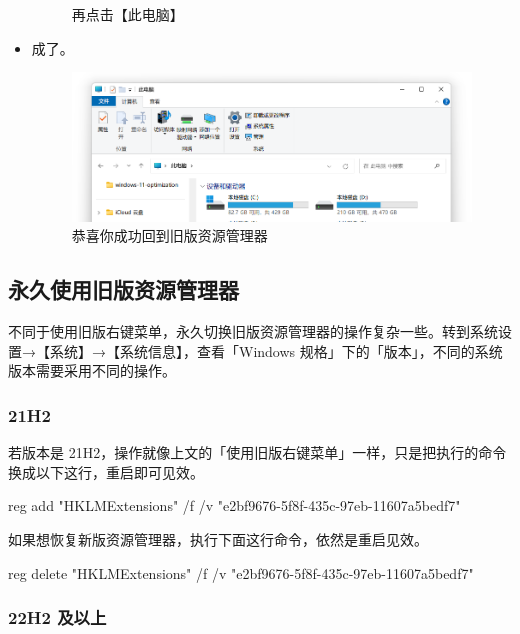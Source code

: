 \begin{itemize}
\begin{figure}[htb!]
\begin{minipage}{.49\textwidth}
        \caption{再点击【此电脑】}
        \label{fig:back-to-this-pc}
      \end{minipage}
    \end{figure}
  \item 成了。
    \begin{figure}[htb!]
      \centering
      \includegraphics[width=.65\textwidth]{assets/advanced/old-explorer.png}
      \caption{恭喜你成功回到旧版资源管理器}
      \label{fig:old-explorer}
    \end{figure}
\end{itemize}

\subsection{永久使用旧版资源管理器}

不同于使用旧版右键菜单，永久切换旧版资源管理器的操作复杂一些。转到系统设置→【系统】→【系统信息】，查看「Windows 规格」下的「版本」，不同的系统版本需要采用不同的操作。

\subsubsection{21H2}

若版本是 21H2，操作就像上文的「使用旧版右键菜单」一样，只是把执行的命令换成以下这行，重启即可见效。

\begin{MissingVerbatim}
  reg add "HKLM\SOFTWARE\Microsoft\Windows\CurrentVersion\Shell Extensions\Blocked" /f /v "{e2bf9676-5f8f-435c-97eb-11607a5bedf7}"
\end{MissingVerbatim}

如果想恢复新版资源管理器，执行下面这行命令，依然是重启见效。

\begin{MissingVerbatim}
  reg delete "HKLM\SOFTWARE\Microsoft\Windows\CurrentVersion\Shell Extensions\Blocked" /f /v "{e2bf9676-5f8f-435c-97eb-11607a5bedf7}"
\end{MissingVerbatim}

\subsubsection{22H2 及以上}

